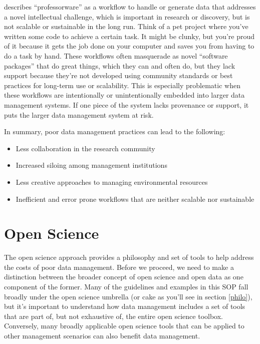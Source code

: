 \documentclass[
]{book}
\providecommand{\tightlist}{%
  \setlength{\itemsep}{0pt}\setlength{\parskip}{0pt}}
\begin{document}
\citet{Mons18} describes ``professorware'' as a workflow to handle or generate data that addresses a novel intellectual challenge, which is important in research or discovery, but is not scalable or sustainable in the long run. Think of a pet project where you've written some code to achieve a certain task. It might be clunky, but you're proud of it because it gets the job done on your computer and saves you from having to do a task by hand. These workflows often masquerade as novel ``software packages'' that do great things, which they can and often do, but they lack support because they're not developed using community standards or best practices for long-term use or scalability. This is especially problematic when these workflows are intentionally or unintentionally embedded into larger data management systems. If one piece of the system lacks provenance or support, it puts the larger data management system at risk.

In summary, poor data management practices can lead to the following:

\begin{itemize}
\tightlist
\item
  Less collaboration in the research community
\item
  Increased siloing among management institutions
\item
  Less creative approaches to managing environmental resources
\item
  Inefficient and error prone workflows that are neither scalable nor sustainable
\end{itemize}

\section{Open Science}\label{opengeneral}

The open science approach provides a philosophy and set of tools to help address the costs of poor data management. Before we proceed, we need to make a distinction between the broader concept of open science and open data as one component of the former. Many of the guidelines and examples in this SOP fall broadly under the open science umbrella (or cake as you'll see in section \ref{philo}), but it's important to understand how data management includes a set of tools that are part of, but not exhaustive of, the entire open science toolbox. Conversely, many broadly applicable open science tools that can be applied to other management scenarios can also benefit data management.
\end{document}
